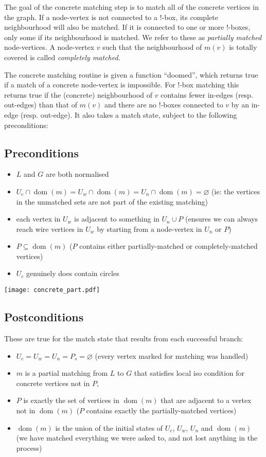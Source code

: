 \documentclass{article}
\DeclareMathOperator{\dom}{dom}
\begin{document}
The goal of the concrete matching step is to match all of the concrete vertices in the graph. If a node-vertex is not connected to a !-box, its complete neighbourhood will also be matched. If it is connected to one or more !-boxes, only some if its neighbourhood is matched. We refer to these as \textit{partially matched} node-vertices. A node-vertex $v$ such that the neighbourhood of $m(v)$ is totally covered is called \textit{completely matched}.

The concrete matching routine is given a function ``doomed'', which returns true if a match of a concrete node-vertex is impossible. For !-box matching this returns true if the (concrete) neighbourhood of $v$ contains fewer in-edges (resp. out-edges) than that of $m(v)$ and there are no !-boxes connected to $v$ by an in-edge (resp. out-edge). It also takes a match state, subject to the following preconditions:

\subsection{Preconditions}
\begin{itemize}
  \item $L$ and $G$ are both normalised
  \item $U_c\cap\dom(m) = U_w\cap\dom(m) = U_n\cap\dom(m) = \varnothing$ (ie: the vertices in the unmatched sets are not part of the existing matching)
  \item each vertex in $U_w$ is adjacent to something in $U_n\cup P$ (ensures we can always reach wire vertices in $U_w$ by starting from a node-vertex in $U_n$ or $P$)
  \item $P \subseteq \dom(m)$ ($P$ contains either partially-matched or completely-matched vertices)
  \item $U_c$ genuinely does contain circles
\end{itemize}

\begin{center}
  \texttt{[image: concrete\_part.pdf]}
\end{center}

\subsection{Postconditions}
These are true for the match state that results from each successful branch:
\begin{itemize}
  \item $U_c = U_w = U_n = P_s = \varnothing$ (every vertex marked for matching was handled)
  \item $m$ is a partial matching from $L$ to $G$ that satisfies local iso condition for concrete vertices not in $P$,
  \item $P$ is exactly the set of vertices in $\dom(m)$ that are adjacent to a vertex not in $\dom(m)$ ($P$ contains exactly the partially-matched vertices)
  \item $\dom(m)$ is the union of the initial states of $U_c$, $U_w$, $U_n$ and $\dom(m)$ (we have matched everything we were asked to, and not lost anything in the process)
\end{itemize}
\end{document}
